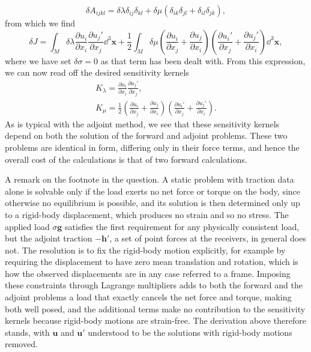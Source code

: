 \documentclass[a4paper,10pt]{paper}
\begin{document}
\begin{enumerate}
\begin{equation*}
    \delta A_{ijkl}=\delta\lambda\delta_{ij}\delta_{kl}+\delta\mu(\delta_{ik}\delta_{jl}+\delta_{il}\delta_{jk}),
\end{equation*}
from which we find
\begin{equation*}
    \delta J=\int_{M}\delta\lambda\frac{\partial u_{i}}{\partial x_{i}}\frac{\partial u_{j}'}{\partial x_{j}}\dd^{3}\mathbf{x}+\frac{1}{2}\int_{M}\delta\mu\left(\frac{\partial u_{i}}{\partial x_{j}}+\frac{\partial u_{j}}{\partial x_{i}}\right)\left(\frac{\partial u_{i}'}{\partial x_{j}}+\frac{\partial u_{j}'}{\partial x_{i}}\right)\dd^{3}\mathbf{x},
\end{equation*}
where we have set $\delta\sigma=0$ as that term has been dealt with. From this expression, we can now read off the desired sensitivity kernels
\begin{gather*}
    K_{\lambda}=\frac{\partial u_{i}}{\partial x_{i}}\frac{\partial u_{j}'}{\partial x_{j}}, \\
    K_{\mu}=\frac{1}{2}\left(\frac{\partial u_{i}}{\partial x_{j}}+\frac{\partial u_{j}}{\partial x_{i}}\right)\left(\frac{\partial u_{i}'}{\partial x_{j}}+\frac{\partial u_{j}'}{\partial x_{i}}\right).
\end{gather*}
As is typical with the adjoint method, we see that these sensitivity kernels depend on both the solution of the forward and adjoint problems. These two problems are identical in form, differing only in their force terms, and hence the overall cost of the calculations is that of two forward calculations.



A remark on the footnote in the question. A static problem with traction data alone is solvable only if the load exerts no net 
force or torque on the body, since otherwise no equilibrium is possible, and its solution is then determined only up to a rigid-body 
displacement, which produces no strain and so no stress. The applied load $\sigma\mathbf{g}$ satisfies the first requirement for any 
physically consistent load, but the adjoint traction $-\mathbf{h}'$, a set of point forces at the receivers, in general does not. 
The resolution is to fix the rigid-body motion explicitly, for example by requiring the displacement to have zero mean 
translation and rotation, which is how the observed displacements are in any case referred to a frame. Imposing these 
constraints through Lagrange multipliers adds to both the forward and the adjoint problems a load that exactly cancels the 
net force and torque, making both well posed, and the additional terms make no contribution to the sensitivity kernels 
because rigid-body motions are strain-free. The derivation above therefore stands, with $\mathbf{u}$ and $\mathbf{u}'$ understood 
to be the solutions with rigid-body motions removed.


\end{enumerate}
\end{document}
